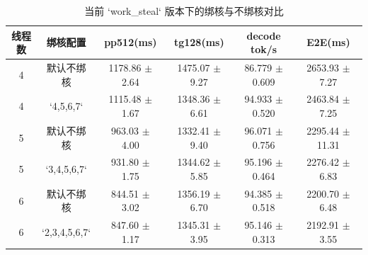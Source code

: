 \begin{table}[ht]
  \centering
  \caption{当前 `work_steal` 版本下的绑核与不绑核对比}
  \label{tab:ws-pin-vs-unpin}
  \begin{tabular}{c c c c c c}
    \hline
    线程数 & 绑核配置 & pp512(ms) & tg128(ms) & decode tok/s & E2E(ms) \\
    \hline
    4 & 默认不绑核 & 1178.86 $\pm$ 2.64 & 1475.07 $\pm$ 9.27 & 86.779 $\pm$ 0.609 & 2653.93 $\pm$ 7.27 \\
    4 & `4,5,6,7` & 1115.48 $\pm$ 1.67 & 1348.36 $\pm$ 6.61 & 94.933 $\pm$ 0.520 & 2463.84 $\pm$ 7.25 \\
    5 & 默认不绑核 & 963.03 $\pm$ 4.00 & 1332.41 $\pm$ 9.40 & 96.071 $\pm$ 0.756 & 2295.44 $\pm$ 11.31 \\
    5 & `3,4,5,6,7` & 931.80 $\pm$ 1.75 & 1344.62 $\pm$ 5.85 & 95.196 $\pm$ 0.464 & 2276.42 $\pm$ 6.83 \\
    6 & 默认不绑核 & 844.51 $\pm$ 3.02 & 1356.19 $\pm$ 6.70 & 94.385 $\pm$ 0.518 & 2200.70 $\pm$ 6.48 \\
    6 & `2,3,4,5,6,7` & 847.60 $\pm$ 1.17 & 1345.31 $\pm$ 3.95 & 95.146 $\pm$ 0.313 & 2192.91 $\pm$ 3.55 \\
    \hline
  \end{tabular}
\end{table}
